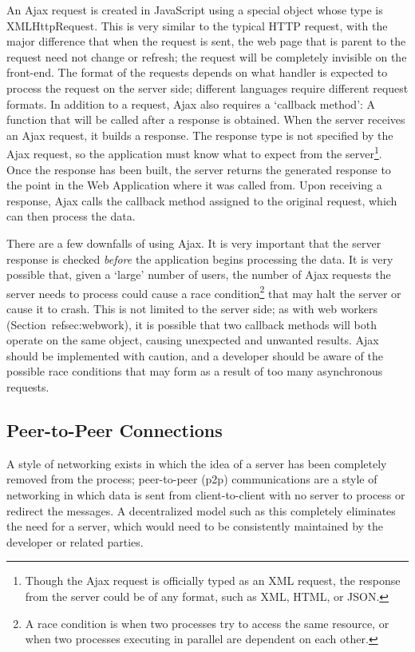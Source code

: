 \documentclass{acmsmall}
\begin{document}
An Ajax request is created in JavaScript using a special object whose type is XMLHttpRequest.  This is very similar to the typical HTTP request, with the major difference that when the request is sent, the web page that is parent to the request need not change or refresh; the request will be completely invisible on the front-end.  The format of the requests depends on what handler is expected to process the request on the server side; different languages require different request formats.  In addition to a request, Ajax also requires a `callback method': A function that will be called after a response is obtained.  When the server receives an Ajax request, it builds a response.  The response type is not specified by the Ajax request, so the application must know what to expect from the server\footnote{Though the Ajax request is officially typed as an XML request, the response from the server could be of any format, such as XML, HTML, or JSON.}.  Once the response has been built, the server returns the generated response to the point in the Web Application where it was called from.  Upon receiving a response, Ajax calls the callback method assigned to the original request, which can then process the data.\cite{racecondition}

There are a few downfalls of using Ajax.  It is very important that the server response is checked \emph{before} the application begins processing the data.  It is very possible that, given a `large' number of users, the number of Ajax requests the server needs to process could cause a race condition\footnote{A race condition is when two processes try to access the same resource, or when two processes executing in parallel are dependent on each other.} that may halt the server or cause it to crash\cite{racecondition}.  This is not limited to the server side; as with web workers (Section~ref{sec:webwork}), it is possible that two callback methods will both operate on the same object, causing unexpected and unwanted results.  Ajax should be implemented with caution, and a developer should be aware of the possible race conditions that may form as a result of too many asynchronous requests.

\subsection{Peer-to-Peer Connections}

A style of networking exists in which the idea of a server has been completely removed from the process; peer-to-peer (p2p) communications are a style of networking in which data is sent from client-to-client with no server to process or redirect the messages.  A decentralized model such as this completely eliminates the need for a server, which would need to be consistently maintained by the developer or related parties.\cite{p2pdef}
\end{document}
